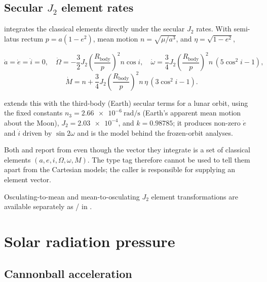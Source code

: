 \subsection{Secular \texorpdfstring{$J_2$}{J2} element rates}

 integrates the classical elements directly under the
secular $J_2$ rates. With semi-latus rectum $p=a(1-e^2)$, mean motion
$n=\sqrt{\mu/a^3}$, and $\eta=\sqrt{1-e^2}$,

\begin{equation}
  \label{eq:dyn-j2-secular}
  \dot{a}=\dot{e}=\dot{i}=0,
  \quad
  \dot{\Omega} = -\frac{3}{2}J_2\left(\frac{R_\mathrm{body}}{p}\right)^{2} n\cos i,
  \quad
  \dot{\omega} = \frac{3}{4}J_2\left(\frac{R_\mathrm{body}}{p}\right)^{2} n\,(5\cos^2 i - 1),
\end{equation}
\begin{equation}
  \label{eq:dyn-j2-secular-M}
  \dot{M} = n + \frac{3}{4}J_2\left(\frac{R_\mathrm{body}}{p}\right)^{2} n\,\eta\,(3\cos^2 i - 1).
\end{equation}

 extends this with the third-body (Earth) secular terms for
a lunar orbit, using the fixed constants $n_3 = \SI{2.66e-6}{\radian\per\second}$
(Earth's apparent mean motion about the Moon), $J_2 = \num{2.03e-4}$, and
$k=0.98785$; it produces non-zero $\dot{e}$ and $\dot{i}$ driven by
$\sin 2\omega$ and is the model behind the frozen-orbit analyses.

\begin{lupntwarning}
  Both  and  report
   from  even though the vector they
  integrate is a set of classical elements $(a,e,i,\Omega,\omega,M)$. The type
  tag therefore cannot be used to tell them apart from the Cartesian models; the
  caller is responsible for supplying an element vector.
\end{lupntwarning}

Osculating-to-mean and mean-to-osculating $J_2$ element transformations are
available separately as  /  in
.

\section{Solar radiation pressure}
\label{sec:dyn-srp}

\subsection{Cannonball acceleration}

